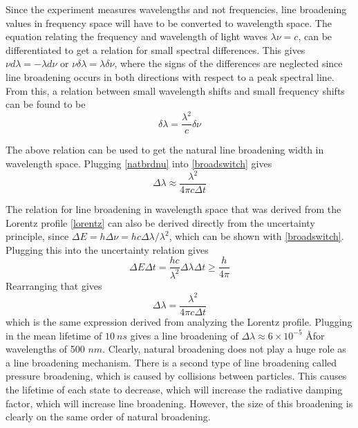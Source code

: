 \documentclass[11pt,letterpaper]{article}
\begin{document}
Since the experiment measures wavelengths and not frequencies, line broadening
values in frequency space will have to be converted to wavelength space. The
equation relating the frequency and wavelength of light waves $\lambda \nu = c$,
can be differentiated to get a relation for small spectral differences. This
gives $\nu d\lambda = -\lambda d\nu$ or 
$\nu \delta \lambda = \lambda \delta \nu$, where the signs of the differences
are neglected since line broadening occurs in both directions with respect to a
peak spectral line. From this, a relation between small wavelength shifts and
small frequency shifts can be found to be
\begin{equation}
    \delta \lambda = \frac{\lambda^2}{c} \delta \nu
    \label{broadswitch}
\end{equation}

The above relation can be used to get the natural line broadening width in
wavelength space. Plugging \eqref{natbrdnu} into \eqref{broadswitch} gives 
\begin{equation}
    \Delta \lambda \approx \frac{\lambda^2}{4\pi c \Delta t}
\end{equation}

The relation for line broadening in wavelength space that was derived from the
Lorentz profile \eqref{lorentz} can also be derived directly from the
uncertainty principle, since $\Delta E = h \Delta \nu = h c \Delta \lambda /
\lambda^2$, which can be shown with \eqref{broadswitch}. Plugging this into the
uncertainty relation gives 
\begin{equation}
    \Delta E \Delta t =
    \frac{hc}{\lambda^2} \Delta \lambda \Delta t \ge \frac{h}{4\pi}
\end{equation}
Rearranging that gives
\begin{equation}
    \Delta \lambda = \frac{\lambda^2}{4\pi c \Delta t}
    \label{natbroad}
\end{equation}
which is the same expression derived from analyzing the Lorentz profile.
Plugging in the mean lifetime of $10\ ns$ gives a line broadening of 
$\Delta \lambda \approx 6 \times 10^{-5}$ \AA for wavelengths of 500 $nm$.
Clearly, natural broadening does not play a huge role as a line broadening
mechanism. There is a second type of line broadening called pressure broadening,
which is caused by collisions between particles. This causes the lifetime of
each state to decrease, which will increase the radiative damping factor, which
will increase line broadening. However, the size of this broadening is clearly
on the same order of natural broadening. \\
\end{document}
